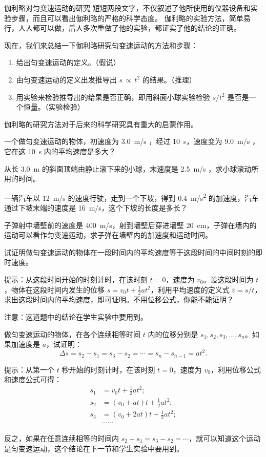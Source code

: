 \begin{Reading}{伽利略对匀变速运动的研究}
短短两段文字，不仅叙述了他所使用的仪器设备和实验步骤，而且可以看出伽利略的严格的科学态度。
伽利略的实验方法，简单易行，人人都可以做，后人多次重做了他的实验，都证实了他的结论的正确。

现在，我们来总结一下伽利略研究匀变速运动的方法和步骤：
\begin{enumerate}
\item 给出匀变速运动的定义。（假说）
\item 由匀变速运动的定义出发推导出 $s\,\propto\,t^2$ 的结果。（推理）
\item 用实验来检验推导出的给果是否正确，即用斜面小球实验检验 $s/t^2$ 是否是一个恒量。（实验检验）
\end{enumerate}

伽利略的研究方法对于后来的科学研究具有重大的启蒙作用。
\end{Reading}

\begin{Practice}\label{prc:const_acceleration}
\begin{question}
\item 一个做匀变速运动的物体，初速度为 \qty{3.0}{m/s} ，经过 \qty{10}{s}，速度变为 \qty{9.0}{m/s} ，它在这 \qty{10}{s} 内的平均速度是多大？
\item 从长 \qty{3.0}{m} 的斜面顶端由静止滚下来的小球，末速度是 \qty{2.5}{m/s} ，求小球滚动所用的时间。
\item 一辆汽车以 \qty{12}{m/s} 的速度行驶，走到一个下坡，得到 \qty{0.4}{m/s^2} 的加速度，汽车通过下坡末端的速度是 \qty{16}{m/s}，这个下坡的长度是多长？
\item 子弹射中墙壁前的速度是 \qty{400}{m/s}，射到墙壁后穿进墙壁 \qty{20}{cm}，子弹在墙内的运动可以看作匀变速运动，求子弹在墙壁内的加速度和运动时间。
\item\label{qn:mean_velocity} 试证明做匀变速运动的物体在一段时间内的平均速度等于这段时间的中间时刻的即时速度。

提示：从这段时间开始的时刻计时，在该时刻 $t=0$，速度为 $v_0$。设这段时间为 $t$，物体在这段时间内发生的位移 $s=v_0t +\frac{1}{2}at^2$，利用平均速度的定义式 $\bar v=s/t$，求出这段时间内的平均速度，即可证明。不用位移公式，你能不能证明？

注意：这道题中的结论在学生实验中要用到。

\item\label{qn:dis_subtraction} 做匀变速运动的物体，在各个连续相等时间 $t$ 内的位移分别是 $s_1, s_2, s_3,\ldots,s_n$。如果加速度是 $a$，试证明：
\[\Delta s=s_2-s_1=s_3-s_2=\cdots=s_n-s_{n-1}=at^2.\]

提示：从第一个 $t$ 秒开始的时刻计时，在该时刻 $t=0$，速度为 $v_0$，利用位移公式和速度公式可得：
\[\begin{split}
s_1&=v_0t +\frac{1}{2}at^2;\\
s_2&=(v_0+at)t +\frac{1}{2}at^2;\\
s_3&=(v_0+2at)t +\frac{1}{2}at^2;\\
&\cdots\cdots
\end{split} \]

反之，如果在任意连续相等的时间内 $s_2-s_1=s_3-s_2=\cdots$，就可以知道这个运动是匀变速运动，这个结论在下一节和学生实验中要用到。
\end{question}
\end{Practice}

